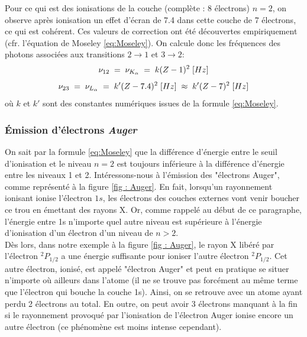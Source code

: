 Pour ce qui est des ionisations de la couche (complète : 8 électrons) $n=2$, on observe après ionisation un effet d'écran de 7.4 dans cette couche de 7 électrons, ce qui est cohérent. Ces valeurs de correction ont été découvertes empiriquement (cfr. l'équation de Moseley \ref{eq:Moseley}).
On calcule donc les fréquences des photons associées aux transitions $2\rightarrow1$ et $3\rightarrow2$:
\begin{equation*}
    \nu_{12}
    \; = \; \nu_{K_\alpha}
    \; = \; k (Z - 1)^2 \;[Hz]
\end{equation*}
\begin{equation*}
    \nu_{23}
    \; = \; \nu_{L_\alpha}
    \; = \; k' (Z - 7.4)^2 \;[Hz]
    \;\approx\;  k' (Z - 7)^2 \;[Hz]
\end{equation*}
où $k$ et $k'$ sont des constantes numériques issues de la formule \ref{eq:Moseley}.



\subsubsection{Émission d'électrons \emph{Auger}}



On sait par la formule \ref{eq:Moseley} que la différence d'énergie entre le seuil d'ionisation et le niveau $n = 2$ est toujours inférieure à la différence d'énergie entre les niveaux 1 et 2. Intéressons-nous à l'émission des "électrons Auger", comme représenté à la figure \ref{fig : Auger}. En fait, lorsqu'un rayonnement ionisant ionise l'électron $1s$, les électrons des couches externes vont venir boucher ce trou en émettant des rayons X. Or, comme rappelé au début de ce paragraphe, l'énergie entre 1s n'importe quel autre niveau est supérieure à l'énergie d'ionisation d'un électron d'un niveau de $n>2$.\\

Dès lors, dans notre exemple à la figure \ref{fig : Auger}, le rayon X libéré par l'électron $^2P_{1/2}$ a une énergie suffisante pour ioniser l'autre électron $^2P_{1/2}$. Cet autre électron, ionisé, est appelé "électron Auger" et peut en pratique se situer n'importe où ailleurs dans l'atome (il ne se trouve pas forcément au même terme que l'électron qui bouche la couche 1s). Ainsi, on se retrouve avec un atome ayant perdu 2 électrons au total. En outre, on peut avoir 3 électrons manquant à la fin si le rayonnement provoqué par l'ionisation de l'électron Auger ionise encore un autre électron (ce phénomène est moins intense cependant).\\


